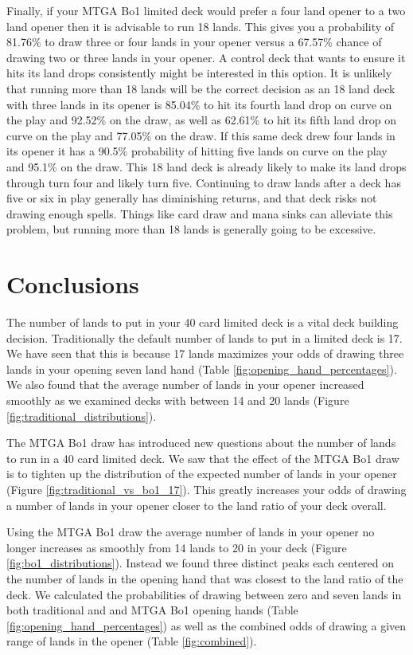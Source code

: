 \documentclass[oneside]{book}   %
\begin{document}
Finally, if your MTGA Bo1 limited deck would prefer a four land opener to a two land opener then it is advisable to run 18 lands. This gives you a probability of 81.76\% to draw three or four lands in your opener versus a 67.57\% chance of drawing two or three lands in your opener. A control deck that wants to ensure it hits its land drops consistently might be interested in this option. It is unlikely that running more than 18 lands will be the correct decision as an 18 land deck with three lands in its opener is 85.04\% to hit its fourth land drop on curve on the play and 92.52\% on the draw, as well as 62.61\% to hit its fifth land drop on curve on the play and 77.05\% on the draw. If this same deck drew four lands in its opener it has a 90.5\% probability of hitting five lands on curve on the play and 95.1\% on the draw. This 18 land deck is already likely to make its land drops through turn four and likely turn five. Continuing to draw lands after a deck has five or six in play generally has diminishing returns, and that deck risks not drawing enough spells. Things like card draw and mana sinks can alleviate this problem, but running more than 18 lands is generally going to be excessive. 

\chapter{Conclusions}

The number of lands to put in your 40 card limited deck is a vital deck building decision. Traditionally the default number of lands to put in a limited deck is 17. We have seen that this is because 17 lands maximizes your odds of drawing three lands in your opening seven land hand (Table \ref{fig:opening_hand_percentages}). We also found that the average number of lands in your opener increased smoothly as we examined decks with between 14 and 20 lands (Figure \ref{fig:traditional_distributions}).   

The MTGA Bo1 draw has introduced new questions about the number of lands to run in a 40 card limited deck. We saw that the effect of the MTGA Bo1 draw is to tighten up the distribution of the expected number of lands in your opener (Figure \ref{fig:traditional_vs_bo1_17}). This greatly increases your odds of drawing a number of lands in your opener closer to the land ratio of your deck overall. 

Using the MTGA Bo1 draw the average number of lands in your opener no longer increases as smoothly from 14 lands to 20 in your deck (Figure \ref{fig:bo1_distributions}). Instead we found three distinct peaks each centered on the number of lands in the opening hand that was closest to the land ratio of the deck. We calculated the probabilities of drawing between zero and seven lands in both traditional and and MTGA Bo1 opening hands (Table \ref{fig:opening_hand_percentages}) as well as the combined odds of drawing a given range of lands in the opener (Table \ref{fig:combined}).
\end{document}
